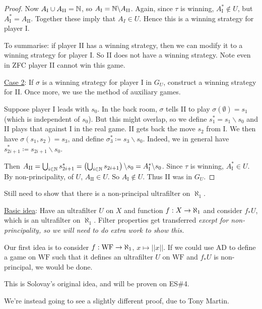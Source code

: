 \documentclass[]{article}
\newcommand{\I}{\textrm{I}}
\newcommand{\II}{\textrm{II}}
\newcommand{\wf}{\textrm{WF}}
\newcommand{\ad}{\textrm{AD}}
\begin{document}
\begin{proof}
    Now $A_\I \cup A_\II = \N$, so $A_\I = \N\backslash A_\II$. Again, since $\tau$ is winning, $A^\ast_\I \not\in U$, but $A^\ast_\I = A_\II$. Together these imply that $A_I \in U$. Hence this is a winning strategy for player I.

    To summarise: if player II has a winning strategy, then we can modify it to a winning strategy for player I. So II does not have a winning strategy. Note even in ZFC player II cannot win this game.

    \underline{Case 2}: If $\sigma$ is a winning strategy for player I in $G_U$, construct a winning strategy for II. Once more, we use the method of auxiliary games.

    Suppose player I leads with $s_0$. In the back room, $\sigma$ tells II to play $\sigma(\emptyset) = s_1$ (which is independent of $s_0$). But this might overlap, so we define $s_1^\ast = s_1\backslash s_0$ and II plays that against I in the real game. II gets back the move $s_2$ from I. We then have $\sigma(s_1,s_2) = s_3$, and define $\sigma^\ast_3 \coloneqq s_3 \backslash s_0$. Indeed, we in general have $s^\ast_{2i+1}\coloneqq s_{2i+1}\backslash s_0$.

    Then $A_\II = \bigcup_{i\in\N}s_{2i+1}^\ast = \left(\bigcup_{i\in\N}s_{2i+1}\right)\backslash s_0 = A^\ast_\I \backslash s_0$. Since $\tau$ is winning, $A^\ast_\I \in U$. By non-principality, of $U$, $A_\II \in U$. So $A_\I\not\in U$. Thus II was in $G_U$.
\end{proof}


Still need to show that there is a non-principal ultrafilter on $\aleph_1$.

\underline{Basic idea}: Have an ultrafilter $U$ on $X$ and function $f:X\rightarrow\aleph_1$ and consider $f_\ast U$, which is an ultrafilter on $\aleph_1$. Filter properties get transferred \it{except} for non-principality, so we will need to do extra work to show this.

Our first idea is to consider $f : \wf \ra \aleph_1$, $x\mapsto ||x||$. If we could use $\ad$ to define a game on $\wf$ such that it defines an ultrafilter $U$ on $\wf$ and $f_\ast U$ is non-principal, we would be done.

This is Solovay's original idea, and will be proven on ES\#4.

We're instead going to see a slightly different proof, due to Tony Martin.
\end{document}
